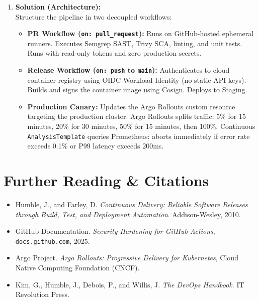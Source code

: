 \begin{enumerate}[leftmargin=18pt]
  \item \textbf{Solution (Architecture):}\\
  Structure the pipeline in two decoupled workflows:
  \begin{itemize}[leftmargin=12pt]
    \item \textbf{PR Workflow (\texttt{on: pull\_request}):} Runs on GitHub-hosted ephemeral runners. Executes Semgrep SAST, Trivy SCA, linting, and unit tests. Runs with read-only tokens and zero production secrets.
    \item \textbf{Release Workflow (\texttt{on: push} to \texttt{main}):} Authenticates to cloud container registry using OIDC Workload Identity (no static API keys). Builds and signs the container image using Cosign. Deploys to Staging.
    \item \textbf{Production Canary:} Updates the Argo Rollouts custom resource targeting the production cluster. Argo Rollouts splits traffic: 5\% for 15 minutes, 20\% for 30 minutes, 50\% for 15 minutes, then 100\%. Continuous \texttt{AnalysisTemplate} queries Prometheus: aborts immediately if error rate exceeds 0.1\% or P99 latency exceeds 200ms.
  \end{itemize}
\end{enumerate}

\section{Further Reading \& Citations}
\begin{itemize}[leftmargin=15pt]
  \item Humble, J., and Farley, D. \emph{Continuous Delivery: Reliable Software Releases through Build, Test, and Deployment Automation}. Addison-Wesley, 2010.
  \item GitHub Documentation. \emph{Security Hardening for GitHub Actions}, \texttt{docs.github.com}, 2025.
  \item Argo Project. \emph{Argo Rollouts: Progressive Delivery for Kubernetes}, Cloud Native Computing Foundation (CNCF).
  \item Kim, G., Humble, J., Debois, P., and Willis, J. \emph{The DevOps Handbook}. IT Revolution Press.
\end{itemize}
